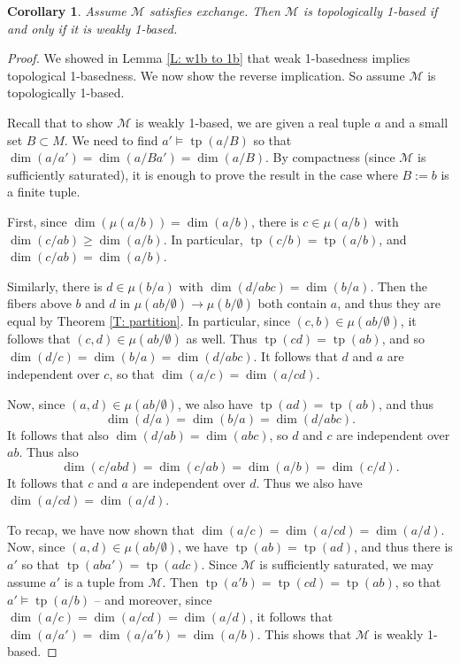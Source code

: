 \documentclass{amsart}
\newtheorem{corollary}[theorem]{Corollary}
\theoremstyle{definition}
\newcommand{\tp}{\operatorname{tp}}
\begin{document}
\begin{corollary}\label{C: weak 1b} Assume $\mathcal M$ satisfies exchange. Then $\mathcal M$ is topologically 1-based if and only if it is weakly 1-based.
\end{corollary}
\begin{proof}
    We showed in Lemma \ref{L: w1b to 1b} that weak 1-basedness implies topological 1-basedness. We now show the reverse implication. So assume $\mathcal M$ is topologically 1-based.

    Recall that to show $\mathcal M$ is weakly 1-based, we are given a real tuple $a$ and a small set $B\subset M$. We need to find $a'\models\tp(a/B)$ so that $\dim(a/a')=\dim(a/Ba')=\dim(a/B)$. By compactness (since $\mathcal M$ is sufficiently saturated), it is enough to prove the result in the case where  $B:=b$ is a finite tuple.

    First, since $\dim(\mu(a/b))=\dim(a/b)$, there is $c\in\mu(a/b)$ with $\dim(c/ab)\geq\dim(a/b)$. In particular, $\tp(c/b)=\tp(a/b)$, and $\dim(c/ab)=\dim(a/b)$.

     Similarly, there is $d\in\mu(b/a)$ with $\dim(d/abc)=\dim(b/a)$. Then the fibers above $b$ and $d$ in $\mu(ab/\emptyset)\rightarrow\mu(b/\emptyset)$ both contain $a$, and thus they are equal by Theorem \ref{T: partition}. In particular, since $(c,b)\in\mu(ab/\emptyset)$, it follows that $(c,d)\in\mu(ab/\emptyset)$ as well. Thus $\tp(cd)=\tp(ab)$, and so $\dim(d/c)=\dim(b/a)=\dim(d/abc)$. It follows that $d$ and $a$ are independent over $c$, so that $\dim(a/c)=\dim(a/cd)$.

    Now, since $(a,d)\in\mu(ab/\emptyset)$, we also have $\tp(ad)=\tp(ab)$, and thus $$\dim(d/a)=\dim(b/a)=\dim(d/abc).$$ It follows that also $\dim(d/ab)=\dim(abc)$, so $d$ and $c$ are independent over $ab$. Thus also $$\dim(c/abd)=\dim(c/ab)=\dim(a/b)=\dim(c/d).$$ It follows that $c$ and $a$ are independent over $d$. Thus we also have $\dim(a/cd)=\dim(a/d)$.
    
    To recap, we have now shown that $\dim(a/c)=\dim(a/cd)=\dim(a/d)$. Now, since $(a,d)\in\mu(ab/\emptyset)$, we have $\tp(ab)=\tp(ad)$, and thus there is $a'$ so that $\tp(aba')=\tp(adc)$. Since $\mathcal M$ is sufficiently saturated, we may assume $a'$ is a tuple from $\mathcal M$. Then $\tp(a'b)=\tp(cd)=\tp(ab)$, so that $a'\models\tp(a/b)$ -- and moreover, since $\dim(a/c)=\dim(a/cd)=\dim(a/d)$, it follows that $\dim(a/a')=\dim(a/a'b)=\dim(a/b)$. This shows that $\mathcal M$ is weakly 1-based.
\end{proof}
\end{document}
